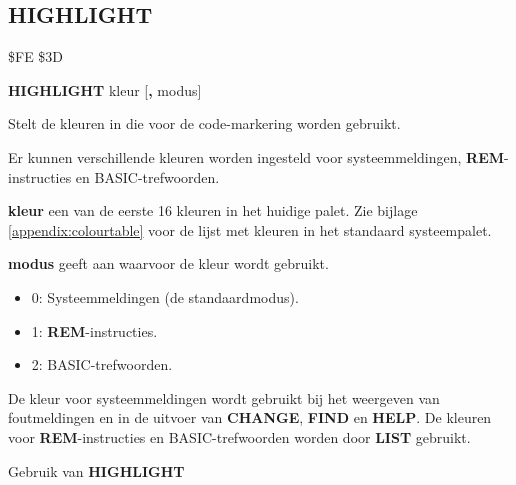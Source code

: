 \subsection{HIGHLIGHT}
\begin{description}[leftmargin=2cm,style=nextline]
\item [Token:]    \$FE \$3D

\item [Formaat:]   {\bf HIGHLIGHT} kleur [{\bf,} modus]

\item [Gebruik:]    Stelt de kleuren in die voor de code-markering worden gebruikt.

                  Er kunnen verschillende kleuren worden ingesteld voor systeemmeldingen, {\bf REM}-instructies en BASIC-trefwoorden.

                  {\bf kleur} een van de eerste 16 kleuren in het huidige palet. Zie bijlage \vref{appendix:colourtable} voor de lijst met kleuren in het standaard systeempalet.

                  {\bf modus} geeft aan waarvoor de kleur wordt gebruikt.
                  \begin{itemize}
                     \item 0: Systeemmeldingen (de standaardmodus).                     \item 1: {\bf REM}-instructies.                     \item 2: BASIC-trefwoorden.
                  \end{itemize}

\item [Opmerkingen:]  De kleur voor systeemmeldingen wordt gebruikt bij het weergeven van foutmeldingen en in de uitvoer van {\bf CHANGE}, {\bf FIND} en {\bf HELP}. De kleuren voor {\bf REM}-instructies en BASIC-trefwoorden worden door {\bf LIST} gebruikt.

\item [Voorbeeld:]  Gebruik van {\bf HIGHLIGHT}


\end{description}


\newpage
